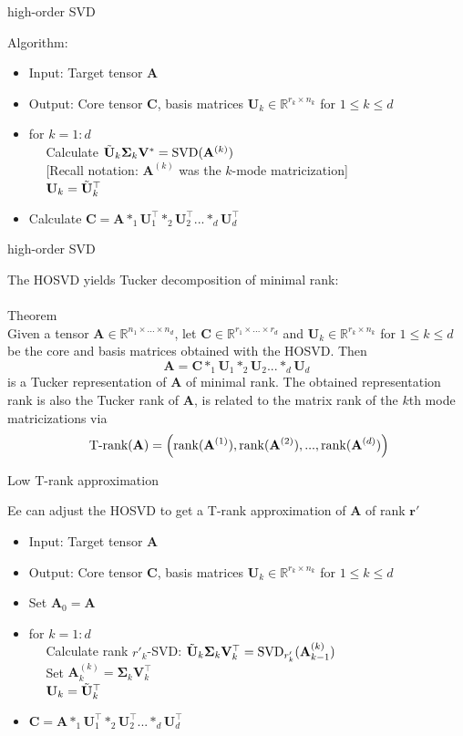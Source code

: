 \documentclass{beamer}
\newcommand{\bgk}[1]{\boldsymbol{#1}}
\newcommand{\bSigma}{\bgk{\Sigma}}
\newcommand{\bvec}[1]{\mathbf{#1}}
\newcommand{\vr}{\bvec{r}}
\newcommand{\vA}{\bvec{A}}
\newcommand{\vC}{\bvec{C}}
\newcommand{\vU}{\bvec{U}}
\newcommand{\vV}{\bvec{V}}
\begin{document}
\begin{frame}{high-order SVD}

Algorithm:
\begin{itemize}
    \item[] Input: Target tensor $\vA$
    \item[] Output: Core tensor $\vC$, basis matrices $\vU_k\in \mathbb{R}^{r_k\times n_k}$ for $1\leq k \leq d$
    \item[] for $k=1:d$\\
    $\quad $ Calculate $\Tilde{\vU}_k \bSigma_k \vV^* = {\rm SVD}(\vA^{(k)})$\\
    $\quad $ [Recall notation: $\vA^{(k)}$ was the $k$-mode matricization]\\
    $\quad $ $\vU_k = \Tilde{\vU}_k^\top $
    \item[] Calculate $\vC = \vA *_{1} \vU_1^\top *_{2} \vU_2^\top ... *_{d} \vU_d^\top$
\end{itemize}

\end{frame}

\begin{frame}{high-order SVD}

The HOSVD yields Tucker decomposition of minimal rank:\\
~\\
Theorem\\
Given a tensor $\vA \in \mathbb{R}^{n_1\times ... \times n_d}$, let $\vC\in \mathbb{R}^{r_1\times ... \times r_d}$ and $\vU_k\in \mathbb{R}^{r_k\times n_k}$ for $1\leq k \leq d$ be the core and basis matrices obtained with the HOSVD. Then
$$
\vA = \vC *_{1} \vU_1 *_{2} \vU_2 ... *_{d} \vU_d
$$
is a Tucker representation of $\vA$ of minimal rank. The obtained representation rank is also the Tucker rank of $\vA$, is related to the matrix rank of the $k$th mode
matricizations via
$$
\text{ T-rank}(\vA)
=
\left({\rm rank}(\vA^{(1)}), {\rm rank}(\vA^{(2)}),...,{\rm rank}(\vA^{(d)})\right)
$$
\end{frame}


\begin{frame}{Low T-rank approximation}

Ee can adjust the HOSVD to get a T-rank approximation of $\vA$ of rank $\vr'$ 
\begin{itemize}
    \item[] Input: Target tensor $\vA$
    \item[] Output: Core tensor $\vC$, basis matrices $\vU_k\in \mathbb{R}^{r_k\times n_k}$ for $1\leq k \leq d$
    \item[] Set $\vA_0 = \vA$
    \item[] for $k=1:d$\\
    $\quad $ Calculate rank $r'_k$-SVD: $\Tilde{\vU}_k \bSigma_k \vV_k^\top = {\rm SVD}_{r'_k}(\vA_{k-1}^{(k)})$\\
    $\quad $ Set $\vA_k^{(k)} = \bSigma_k \vV_k^\top$\\
    $\quad $ $\vU_k = \Tilde{\vU}_k^\top $
    \item[] $\vC = \vA *_{1} \vU_1^\top *_{2} \vU_2^\top ... *_{d} \vU_d^\top$
\end{itemize}
\end{frame}
\end{document}
